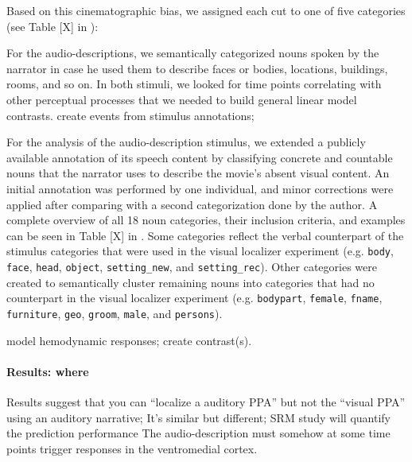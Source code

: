 Based on this cinematographic bias, we assigned each cut to one of five
categories (see Table [X] in \citep{haeusler2022processing}):
%




%
For the audio-descriptions, we semantically categorized nouns spoken by the
narrator in case he used them to describe faces or bodies, locations, buildings,
rooms, and so on.
%
In both stimuli, we looked for time points correlating with other perceptual
processes that we needed to build general linear model contrasts.
%
create events from stimulus annotations;

For the analysis of the audio-description stimulus, we extended a publicly
available annotation of its speech content \citep{haeusler2021studyforrest} by
classifying concrete and countable nouns that the narrator uses to describe the
movie's absent visual content.
An initial annotation was performed by one individual,
and minor corrections were applied after comparing with a second categorization
done by the author.
A complete overview of all 18 noun categories, their inclusion criteria, and
examples can be seen in Table [X] in \citep{haeusler2022processing}.
Some categories reflect the verbal counterpart of the stimulus categories that
were used in the visual localizer experiment (e.g. \texttt{body}, \texttt{face},
\texttt{head}, \texttt{object}, \texttt{setting\_new}, and
\texttt{setting\_rec}).
Other categories were created to semantically cluster remaining nouns into
categories that had no counterpart in the visual localizer experiment (e.g.
\texttt{bodypart}, \texttt{female}, \texttt{fname}, \texttt{furniture},
\texttt{geo}, \texttt{groom}, \texttt{male}, and \texttt{persons}).


%
model hemodynamic responses;
%
create contrast(s).




\paragraph{Results: where}

%
Results suggest that you can ``localize a auditory PPA'' but not the ``visual
PPA'' using an auditory narrative; It's similar but different; SRM study will
quantify the prediction performance
%
The audio-description must somehow at some time points trigger responses in the
ventromedial cortex.

